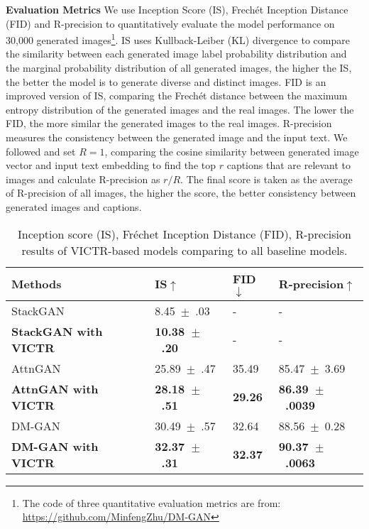 \documentclass[11pt]{article}
\begin{document}
\noindent \textbf{Evaluation Metrics} We use Inception Score (IS), Frech\'et Inception Distance (FID) and R-precision to quantitatively evaluate the model performance on 30,000 generated images\footnote{The code of three quantitative evaluation metrics are from: \url{https://github.com/MinfengZhu/DM-GAN}}. IS \cite{salimans2016improved} uses Kullback-Leiber (KL) divergence to compare the similarity between each generated image label probability distribution and the marginal probability distribution of all generated images, the higher the IS, the better the model is to generate diverse and distinct images. FID \cite{heusel2017gans} is an improved version of IS, comparing the Frech\'et distance between the maximum entropy distribution of the generated images and the real images. The lower the FID, the more similar the generated images to the real images. R-precision measures the consistency between the generated image and the input text. We followed  and set $R=1$, comparing the cosine similarity between generated image vector and input text embedding to find the top $r$ captions that are relevant to images and calculate R-precision as $r/R$. The final score is taken as the average of R-precision of all images, the higher the score, the better consistency between generated images and captions.





\begin{table}[t]
    \centering
    \small
    \begin{tabular}{|p{3.5cm}|p{1.8cm}|p{1.8cm}|p{1.8cm}|}
    \hline 
    \bf{Methods} & \bf{IS}$\uparrow$ & \bf{FID}$\downarrow$ & \bf{R-precision}$\uparrow$ \\
    \hline
    StackGAN & 8.45~$\pm$~.03& - & - \\
        \bf{StackGAN with VICTR} & \bf{10.38~$\pm$~.20} & - & - \\
    \Xhline{1pt}
    AttnGAN & 25.89~$\pm$~.47& 35.49& 85.47~$\pm$~3.69 \\
        \bf{AttnGAN with VICTR}  & \bf{28.18~$\pm$~.51} & \bf{29.26}& \bf{86.39~$\pm$~.0039} \\
    \Xhline{1pt}
    DM-GAN & 30.49~$\pm$~.57& 32.64& 88.56~$\pm$~0.28\\
        \bf{DM-GAN with VICTR} & \bf{32.37~$\pm$~.31} & \bf{32.37}& \bf{90.37~$\pm$~.0063} \\
    \hline
    \end{tabular}
    \caption{\label{tab:result_table} Inception score (IS), Fréchet Inception Distance (FID), R-precision results of VICTR-based models comparing to all baseline models.}
    \vspace{-4mm}
\end{table}
\end{document}
